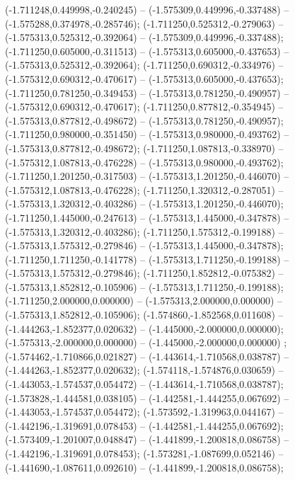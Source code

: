  (-1.711248,0.449998,-0.240245) -- (-1.575309,0.449996,-0.337488) -- (-1.575288,0.374978,-0.285746);
 (-1.711250,0.525312,-0.279063) -- (-1.575313,0.525312,-0.392064) -- (-1.575309,0.449996,-0.337488);
 (-1.711250,0.605000,-0.311513) -- (-1.575313,0.605000,-0.437653) -- (-1.575313,0.525312,-0.392064);
 (-1.711250,0.690312,-0.334976) -- (-1.575312,0.690312,-0.470617) -- (-1.575313,0.605000,-0.437653);
 (-1.711250,0.781250,-0.349453) -- (-1.575313,0.781250,-0.490957) -- (-1.575312,0.690312,-0.470617);
 (-1.711250,0.877812,-0.354945) -- (-1.575313,0.877812,-0.498672) -- (-1.575313,0.781250,-0.490957);
 (-1.711250,0.980000,-0.351450) -- (-1.575313,0.980000,-0.493762) -- (-1.575313,0.877812,-0.498672);
 (-1.711250,1.087813,-0.338970) -- (-1.575312,1.087813,-0.476228) -- (-1.575313,0.980000,-0.493762);
 (-1.711250,1.201250,-0.317503) -- (-1.575313,1.201250,-0.446070) -- (-1.575312,1.087813,-0.476228);
 (-1.711250,1.320312,-0.287051) -- (-1.575313,1.320312,-0.403286) -- (-1.575313,1.201250,-0.446070);
 (-1.711250,1.445000,-0.247613) -- (-1.575313,1.445000,-0.347878) -- (-1.575313,1.320312,-0.403286);
 (-1.711250,1.575312,-0.199188) -- (-1.575313,1.575312,-0.279846) -- (-1.575313,1.445000,-0.347878);
 (-1.711250,1.711250,-0.141778) -- (-1.575313,1.711250,-0.199188) -- (-1.575313,1.575312,-0.279846);
 (-1.711250,1.852812,-0.075382) -- (-1.575313,1.852812,-0.105906) -- (-1.575313,1.711250,-0.199188);
 (-1.711250,2.000000,0.000000) -- (-1.575313,2.000000,0.000000) -- (-1.575313,1.852812,-0.105906);
 (-1.574860,-1.852568,0.011608) -- (-1.444263,-1.852377,0.020632) -- (-1.445000,-2.000000,0.000000);
 (-1.575313,-2.000000,0.000000) -- (-1.445000,-2.000000,0.000000) ;
 (-1.574462,-1.710866,0.021827) -- (-1.443614,-1.710568,0.038787) -- (-1.444263,-1.852377,0.020632);
 (-1.574118,-1.574876,0.030659) -- (-1.443053,-1.574537,0.054472) -- (-1.443614,-1.710568,0.038787);
 (-1.573828,-1.444581,0.038105) -- (-1.442581,-1.444255,0.067692) -- (-1.443053,-1.574537,0.054472);
 (-1.573592,-1.319963,0.044167) -- (-1.442196,-1.319691,0.078453) -- (-1.442581,-1.444255,0.067692);
 (-1.573409,-1.201007,0.048847) -- (-1.441899,-1.200818,0.086758) -- (-1.442196,-1.319691,0.078453);
 (-1.573281,-1.087699,0.052146) -- (-1.441690,-1.087611,0.092610) -- (-1.441899,-1.200818,0.086758);
